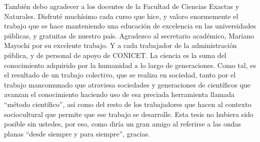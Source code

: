 También debo agradecer a los docentes de la Facultad de Ciencias Exactas y Naturales. 
Disfruté muchísimo cada curso que hice, y valoro enormemente el trabajo 
que se hace manteniendo una educación de excelencia en las universidades públicas, 
y gratuitas de nuestro país.
Agradezco al secretario académico, 
Mariano Mayochi por su excelente trabajo. 
Y a cada trabajador de la administración pública, y de personal de apoyo de 
CONICET. La ciencia es la suma del conocimiento adquirido por la humanidad 
a lo largo de generaciones. Como tal, es el resultado de un trabajo colectivo, 
que se realiza en sociedad, tanto por el trabajo mancomunado 
que atraviesa sociedades y generaciones de científicos 
que avanzan el conocimiento haciendo uso 
de esa preciada herramienta llamada ``método científico'', 
así como del resto de los trabajadores que hacen al contexto sociocultural 
que permite que ese trabajo se 
desarrolle. Esta tesis no hubiera sido posible sin ustedes, 
por eso, como diría un gran amigo al referirse 
a las ondas planas ``desde siempre y para siempre'', gracias.
